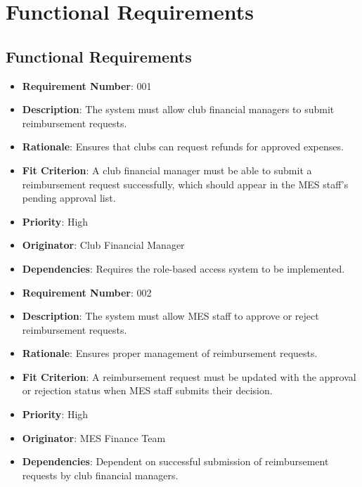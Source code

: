 \documentclass[12pt]{article}
\begin{document}
\section{Functional Requirements}
\subsection{Functional Requirements}

\begin{itemize}

  \item \textbf{Requirement Number}: 001
  \item \textbf{Description}: The system must allow club financial managers to submit reimbursement requests.
  \item \textbf{Rationale}: Ensures that clubs can request refunds for approved expenses.
  \item \textbf{Fit Criterion}: A club financial manager must be able to submit a reimbursement request successfully, which should appear in the MES staff's pending approval list.
  \item \textbf{Priority}: High
  \item \textbf{Originator}: Club Financial Manager
  \item \textbf{Dependencies}: Requires the role-based access system to be implemented.
  
  \bigskip

  \item \textbf{Requirement Number}: 002
  \item \textbf{Description}: The system must allow MES staff to approve or reject reimbursement requests.
  \item \textbf{Rationale}: Ensures proper management of reimbursement requests.
  \item \textbf{Fit Criterion}: A reimbursement request must be updated with the approval or rejection status when MES staff submits their decision.
  \item \textbf{Priority}: High
  \item \textbf{Originator}: MES Finance Team
  \item \textbf{Dependencies}: Dependent on successful submission of reimbursement requests by club financial managers.

  \bigskip


\end{itemize}
\end{document}
